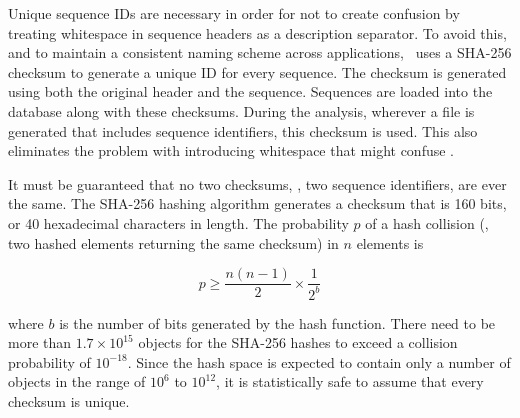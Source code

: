 Unique sequence IDs are necessary in order for  not to create
confusion by treating whitespace in sequence headers as a description
separator. To avoid this, and to maintain a consistent naming scheme across
applications, \pname~uses a SHA-256 checksum to generate a unique ID for every
sequence. The checksum is generated using both the original header and the
sequence. Sequences are loaded into the database along with these checksums.
During the analysis, wherever a file is generated that includes sequence
identifiers, this checksum is used. This also eliminates the problem with
 introducing whitespace that might confuse
.

It must be guaranteed that no two checksums, \ie, two sequence identifiers, are
ever the same. The SHA-256 hashing algorithm generates a checksum that is 160 bits,
or 40 hexadecimal characters in length. The probability $p$ of a hash collision
(\ie, two hashed elements returning the same checksum) in $n$ elements is

\begin{equation}
p \ge \frac{n (n-1)}{2} \times \frac{1}{2^b}
\label{eq:hashcollision}
\end{equation}

where $b$ is the number of bits generated by the hash function. There need to be
more than $1.7 \times 10^{15}$ objects for the SHA-256 hashes to exceed a collision
probability of $10^{-18}$. Since the hash space is expected to contain only a
number of objects in the range of $10^6$ to $10^{12}$, it is statistically safe
to assume that every checksum is unique. 


